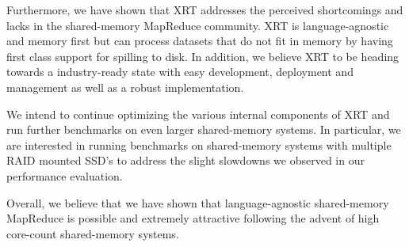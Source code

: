 \documentclass[twocolumn,11px]{article}       %
\begin{document}
Furthermore, we have shown that XRT addresses the perceived shortcomings and lacks in the shared-memory MapReduce community.
XRT is language-agnostic and memory first but can process datasets that do not fit in memory by having first class support for spilling to disk.
In addition, we believe XRT to be heading towards a industry-ready state with easy development, deployment and management as well as a robust implementation.

We intend to continue optimizing the various internal components of XRT and run further benchmarks on even larger shared-memory systems.
In particular, we are interested in running benchmarks on shared-memory systems with multiple RAID mounted SSD's to address the slight slowdowns we observed in our performance evaluation.

Overall, we believe that we have shown that language-agnostic shared-memory MapReduce is possible and extremely attractive following the advent of high core-count shared-memory systems.



\end{document}
